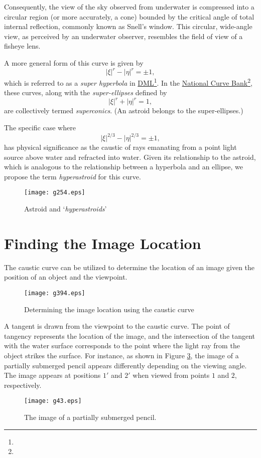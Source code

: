 \documentclass[twocolumn]{article}
\begin{document}
Consequently, the view of the sky observed from underwater is compressed into a circular region (or more accurately, a cone) bounded by the critical angle of total internal reflection, commonly known as Snell's window. This circular, wide-angle view, as perceived by an underwater observer, resembles the field of view of a fisheye lens.

A more general form of this curve is given by 
$$ \left| \xi \right|^{r} - \left| \eta \right|^{r} = \pm1, $$
which is referred to as a \emph{super hyperbola} in \href{http://dynamicmathematicslearning.com/super-ellipse.html}{DML}\footnote{}. In the \href{https://old.nationalcurvebank.org/superconicncb/superconicncb.htm}{National Curve Bank}\footnote{}, these curves, along with the \emph{super-ellipses} defined by
$$ \left| \xi \right|^{r} + \left| \eta \right|^{r} = 1, $$
are collectively termed \emph{superconics}. (An astroid belongs to the super-ellipses.) 

The specific case where 
$$ \left| \xi \right|^{2/3} - \left| \eta \right|^{2/3} = \pm1, $$
has physical significance as the caustic of rays emanating from a point light source above water and refracted into water. Given its relationship to the astroid, which is analogous to the relationship between a hyperbola and an ellipse, we propose the term \emph{hyperastroid} for this curve.

\begin{figure}
	\centering
	\texttt{[image: g254.eps]}
	\caption{Astroid and `\emph{hyperastroids}'}
	\label{fig:hyperastroid}
\end{figure}

\section{Finding the Image Location}

The caustic curve can be utilized to determine the location of an image given the position of an object and the viewpoint.

\begin{figure}[h]
	\centering
	\texttt{[image: g394.eps]}
	\caption{Determining the image location using the caustic curve}
	\label{fig:image_caustic}
\end{figure}

A tangent is drawn from the viewpoint to the caustic curve. The point of tangency represents the location of the image, and the intersection of the tangent with the water surface corresponds to the point where the light ray from the object strikes the surface.
For instance, as shown in Figure \ref{fig:pencil_view}, the image of a partially submerged pencil appears differently depending on the viewing angle. The image appears at positions $1'$ and $2'$ when viewed from points $1$ and $2$, respectively.
\begin{figure}[ht]
	\centering
	\texttt{[image: g43.eps]}
	\caption{The image of a partially submerged pencil.}
	\label{fig:pencil_view}
\end{figure}
\end{document}
